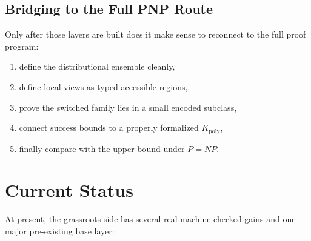 \documentclass[11pt]{article}
\theoremstyle{remark}
\begin{document}
\subsection{Bridging to the Full PNP Route}

Only after those layers are built does it make sense to reconnect to the full
proof program:
\begin{enumerate}[leftmargin=1.5em]
  \item define the distributional ensemble cleanly,
  \item define local views as typed accessible regions,
  \item prove the switched family lies in a small encoded subclass,
  \item connect success bounds to a properly formalized \(K_{\mathrm{poly}}\),
  \item finally compare with the upper bound under \(P=NP\).
\end{enumerate}

\section{Current Status}

At present, the grassroots side has several real machine-checked gains and one
major pre-existing base layer:
\end{document}
